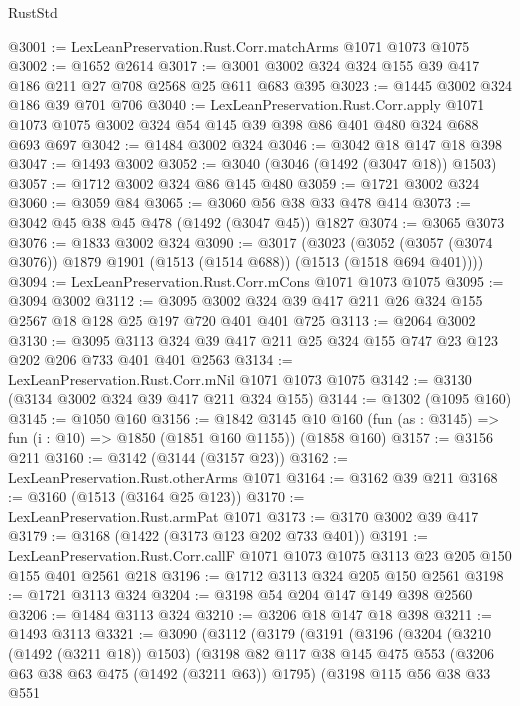 \begin{lexlean}{RustStd}
\begin{coremodule}
{\begin{coremodule}
{{{{{{{{@3001 := LexLeanPreservation.Rust.Corr.matchArms @1071 @1073 @1075
@3002 := @1652 @2614
@3017 := @3001 @3002 @324 @324 @155 @39 @417 @186 @211 @27 @708 @2568 @25 @611 @683 @395
@3023 := @1445 @3002 @324 @186 @39 @701 @706
@3040 := LexLeanPreservation.Rust.Corr.apply
    @1071
    @1073
    @1075
    @3002
    @324
    @54
    @145
    @39
    @398
    @86
    @401
    @480
    @324
    @688
    @693
    @697
@3042 := @1484 @3002 @324
@3046 := @3042 @18 @147 @18 @398
@3047 := @1493 @3002
@3052 := @3040 (@3046 (@1492 (@3047 @18)) @1503)
@3057 := @1712 @3002 @324 @86 @145 @480
@3059 := @1721 @3002 @324
@3060 := @3059 @84
@3065 := @3060 @56 @38 @33 @478 @414
@3073 := @3042 @45 @38 @45 @478 (@1492 (@3047 @45)) @1827
@3074 := @3065 @3073
@3076 := @1833 @3002 @324
@3090 := @3017
    (@3023 (@3052 (@3057 (@3074 @3076)) @1879 @1901 (@1513 (@1514 @688)) (@1513 (@1518 @694 @401))))
@3094 := LexLeanPreservation.Rust.Corr.mCons @1071 @1073 @1075
@3095 := @3094 @3002
@3112 := @3095 @3002 @324 @39 @417 @211 @26 @324 @155 @2567 @18 @128 @25 @197 @720 @401 @401 @725
@3113 := @2064 @3002
@3130 := @3095 @3113 @324 @39 @417 @211 @25 @324 @155 @747 @23 @123 @202 @206 @733 @401 @401 @2563
@3134 := LexLeanPreservation.Rust.Corr.mNil @1071 @1073 @1075
@3142 := @3130 (@3134 @3002 @324 @39 @417 @211 @324 @155)
@3144 := @1302 (@1095 @160)
@3145 := @1050 @160
@3156 := @1842
    @3145
    @10
    @160
    (fun (as : @3145) => fun (i : @10) => @1850 (@1851 @160 @1155))
    (@1858 @160)
@3157 := @3156 @211
@3160 := @3142 (@3144 (@3157 @23))
@3162 := LexLeanPreservation.Rust.otherArms @1071
@3164 := @3162 @39 @211
@3168 := @3160 (@1513 (@3164 @25 @123))
@3170 := LexLeanPreservation.Rust.armPat @1071
@3173 := @3170 @3002 @39 @417
@3179 := @3168 (@1422 (@3173 @123 @202 @733 @401))
@3191 := LexLeanPreservation.Rust.Corr.callF
    @1071
    @1073
    @1075
    @3113
    @23
    @205
    @150
    @155
    @401
    @2561
    @218
@3196 := @1712 @3113 @324 @205 @150 @2561
@3198 := @1721 @3113 @324
@3204 := @3198 @54 @204 @147 @149 @398 @2560
@3206 := @1484 @3113 @324
@3210 := @3206 @18 @147 @18 @398
@3211 := @1493 @3113
@3321 := @3090
    (@3112
      (@3179
        (@3191
          (@3196
            (@3204
              (@3210 (@1492 (@3211 @18)) @1503)
              (@3198
                @82
                @117
                @38
                @145
                @475
                @553
                (@3206 @63 @38 @63 @475 (@1492 (@3211 @63)) @1795)
                (@3198
                  @115
                  @56
                  @38
                  @33
                  @551
}}}}}}}}
\end{coremodule}}
\end{coremodule}
\end{lexlean}
